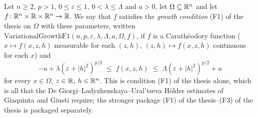 \begin{definition}
Let $n\ge2$, $p>1$, $0\le\varepsilon\le1$, $0<\lambda\le\Lambda$ and $a>0$, let
$\Omega\subseteq\mathbb{R}^n$ and let $f\colon\mathbb{R}^n\times\mathbb{R}\times\mathbb{R}^n\to\mathbb{R}$.  We say that
$f$ satisfies the \emph{growth condition} (F1) of the thesis on $\Omega$ with these
parameters, written
$\mathrm{VariationalGrowthF1}(n,p,\varepsilon,\lambda,\Lambda,a,\Omega,f)$, if
$f$ is a Carath\'eodory function ($x\mapsto f(x,z,h)$ measurable for each
$(z,h)$, $(z,h)\mapsto f(x,z,h)$ continuous for each $x$) and
\[
-a+\lambda(\varepsilon+|h|^2)^{p/2}\;\le\;f(x,z,h)\;\le\;\Lambda(\varepsilon+|h|^2)^{p/2}+a
\]
for every $x\in\Omega$, $z\in\mathbb{R}$, $h\in\mathbb{R}^n$.  This is condition (F1) of the thesis
alone, which is all that the De Giorgi--Ladyzhenskaya--Ural'tseva H\"older
estimates of Giaquinta and Giusti require; the stronger package
(F1) of the thesis--(F3) of the thesis is packaged separately.
\end{definition}
